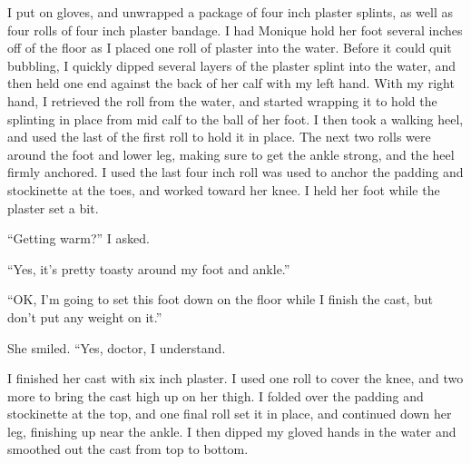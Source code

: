 I put on gloves, and unwrapped a package of four inch plaster splints, as well as four
rolls of four inch plaster bandage. I had Monique hold her foot several inches off of the floor
as I placed one roll of plaster into the water. Before it could quit bubbling, I quickly dipped
several layers of the plaster splint into the water, and then held one end against the back of
her calf with my left hand. With my right hand, I retrieved the roll from the water, and started
wrapping it to hold the splinting in place from mid calf to the ball of her foot. I then took a
walking heel, and used the last of the first roll to hold it in place. The next two rolls were
around the foot and lower leg, making sure to get the ankle strong, and the heel firmly
anchored. I used the last four inch roll was used to anchor the padding and stockinette at the
toes, and worked toward her knee. I held her foot while the plaster set a bit.

``Getting warm?'' I asked.

``Yes, it's pretty toasty around my foot and ankle.''

``OK, I'm going to set this foot down on the floor while I finish the cast, but don't put
any weight on it.''

She smiled. ``Yes, doctor, I understand.

I finished her cast with six inch plaster. I used one roll to cover the knee, and two more
to bring the cast high up on her thigh. I folded over the padding and stockinette at the top,
and one final roll set it in place, and continued down her leg, finishing up near the ankle. I
then dipped my gloved hands in the water and smoothed out the cast from top to bottom.

